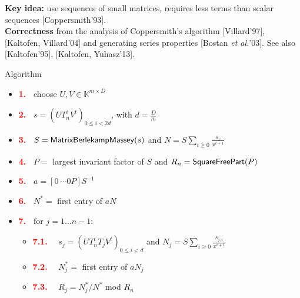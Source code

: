 \documentclass[final]{beamer}
\newlength{\twocolwid}
\begin{document}
\begin{frame}[t]
\begin{columns}[t]
\begin{column}{\twocolwid}

\textbf{Key idea:} use sequences of small matrices, requires less
terms than scalar sequences [Coppersmith'93]. \\ \textbf{Correctness}
 from the analysis of Coppersmith's algorithm [Villard'97],
[Kaltofen, Villard'04] and generating series properties
[Bostan {\it et al.}'03].  See also [Kaltofen'95], [Kaltofen, Yuhasz'13].

\vspace{1em}

	
	\begin{alertblock}{{\sf Algorithm}}
		\begin{itemize}
			\item[]\textcolor{red}{\bf 1.~} {\sf choose $U,V \in \mathbb{K}^{m \times D}$}
			\item[]\textcolor{red}{\bf 2.~} {\sf $s= (UT_n^iV^t)_{0 \le i < 2d}$, with $d = \frac{D}{m}$}
			\item[]\textcolor{red}{\bf 3.~} {\sf $S = {\sf MatrixBerlekampMassey}(s)$ and $N = S\sum_{i\ge 0} \frac{s_i}{x^{i+1}}$}
			\item[]\textcolor{red}{\bf 4.~} {\sf $P=$ largest invariant factor of $S$ and $R_n={\sf SquareFreePart}(P)$}
                        \item[]\textcolor{red}{\bf 5.~} {\sf $a = [0 ~\cdots 0 P] S^{-1}$}
			\item[]\textcolor{red}{\bf 6.~} {\sf $N^*=$ first entry of $aN$}
			\item[]\textcolor{red}{\bf 7.~} {\sf for $j = 1 \dots n-1$:}
			\begin{itemize}
			\item[]\textcolor{red}{\bf 7.1.} ~~{\sf $s_j = (UT_n^i T_j V^t)_{0 \le i < d}$ and $N_j = S\sum_{i\ge 0} \frac{s_{j,i}}{x^{i+1}}$}
                        \item[]\textcolor{red}{\bf 7.2.} ~~{\sf $N^*_j=$ first entry of $aN_j$}
			\item[]\textcolor{red}{\bf 7.3.} ~~{\sf $R_j=N^*_j/N^*$ mod $R_n$}
			\end{itemize}
		\end{itemize}
	\end{alertblock}



\end{column}
\end{columns}
\end{frame}
\end{document}
